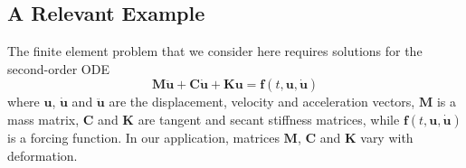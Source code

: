 \subsection{A Relevant Example}
\label{sec:solve2ndOrderODE}

The finite element problem that we consider here requires solutions for the second-order ODE
\begin{displaymath}
    \mathbf{M} \ddot{\mathbf{u}} + \mathbf{C} \dot{\mathbf{u}} + \mathbf{K}\mathbf{u} = \mathbf{f}( t , \mathbf{u} , \dot{\mathbf{u}} )
\end{displaymath}
where $\mathbf{u}$, $\dot{\mathbf{u}}$ and $\ddot{\mathbf{u}}$ are the displacement, velocity and acceleration vectors, $\mathbf{M}$ is a mass matrix, $\mathbf{C}$ and $\mathbf{K}$ are tangent and secant stiffness matrices, while $\mathbf{f}( t , \mathbf{u} , \dot{\mathbf{u}} )$ is a forcing function.  In our application, matrices $\mathbf{M}$, $\mathbf{C}$ and $\mathbf{K}$ vary with deformation.

